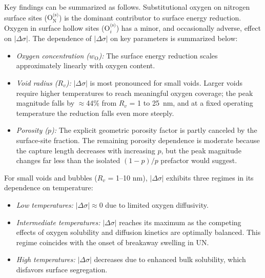 \documentclass[preprint,12pt,sort&compress]{elsarticle}
\newcommand{\?}{\stackrel{?}{=}}
\begin{document}
Key findings can be summarized as follows. Substitutional oxygen on nitrogen surface sites ($\text{O}_\text{N}^\text{(s)}$) is the dominant contributor to surface energy reduction. Oxygen in surface hollow sites ($\text{O}_i^\text{(s)}$) has a minor, and occasionally adverse, effect on $|\Delta \sigma|$. The dependence of $|\Delta \sigma|$ on key parameters is summarized below:
\begin{itemize}
    \item \textit{Oxygen concentration ($w_\text{O}$):} The surface energy reduction scales approximately linearly with oxygen content.
    \item \textit{Void radius ($R_v$):} $|\Delta \sigma|$ is most pronounced for small voids. Larger voids require higher temperatures to reach meaningful oxygen coverage; the peak magnitude falls by $\approx$44\% from $R_v$ = 1 to 25~nm, and at a fixed operating temperature the reduction falls even more steeply.
    \item \textit{Porosity ($p$):} The explicit geometric porosity factor is partly canceled by the surface-site fraction. The remaining porosity dependence is moderate because the capture length decreases with increasing $p$, but the peak magnitude changes far less than the isolated $(1-p)/p$ prefactor would suggest.
    \end{itemize}

\vspace{0.5cm}

For small voids and bubbles ($R_v$ = 1--10 nm), $|\Delta \sigma|$ exhibits three regimes in its dependence on temperature:
    \begin{itemize}
    \item \textit{Low temperatures:} $|\Delta \sigma| \approx 0$ due to limited oxygen diffusivity.
    \item \textit{Intermediate temperatures:} $|\Delta \sigma|$ reaches its maximum as the competing effects of oxygen solubility and diffusion kinetics are optimally balanced. This regime coincides with the onset of breakaway swelling in UN.
    \item \textit{High temperatures:} $|\Delta \sigma|$ decreases due to enhanced bulk solubility, which disfavors surface segregation.
    \end{itemize}
\end{document}
